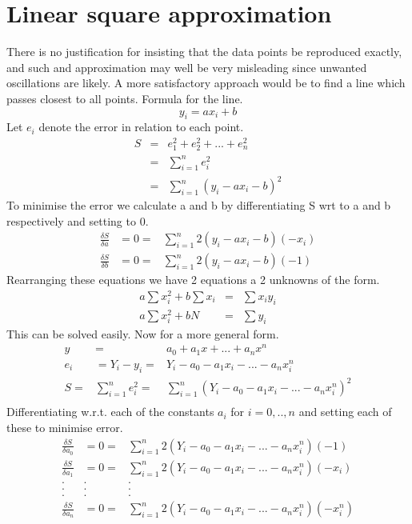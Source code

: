 \section{Linear square approximation}
There is no justification for insisting that the data points be reproduced exactly, and such and approximation may well be very misleading since unwanted oscillations are likely.  A more satisfactory approach would be to find a line which
passes closest to all points.
Formula for the line.
\[y_{i} = ax_i +b \]
Let $e_i$ denote the error in relation to each point.
\begin{eqnarray*}
 S &= &e_{1}^2 + e_{2}^2+ . . . + e_{n}^2 \\
& = & \sum_{i=1}^{n}e_i^2 \\
& = & \sum_{i=1}^{n}(y_i-ax_i-b)^2
\end{eqnarray*}
To minimise the error we calculate a and b by differentiating S wrt to a and b
respectively and setting to 0.
\begin{eqnarray*}
\frac{\delta S}{\delta a}& = 0 =& \sum_{i=1}^{n}2(y_i-ax_i-b)(-x_i)\\
\frac{\delta S}{\delta b}& = 0 =& \sum_{i=1}^{n}2(y_i-ax_i-b)(-1)
\end{eqnarray*}
Rearranging these equations we have 2 equations a 2 unknowns of the form.
\begin{eqnarray*}
a\sum x_{i}^2 + b \sum x_i &= & \sum x_i y_i \\
a\sum x_{i}^2 + b N &= & \sum  y_i 
\end{eqnarray*}
This can be solved easily.  Now for a more general form.
\begin{eqnarray*}
y & = & a_0 +a_1 x + ... + a_n x^n \\
e_i & = Y_i-y_i= & Y_i - a_0 -a_1 x_i - ... - a_n x_i^n \\
S = & \sum_{i=1}^n e_i^2 = &\sum_{i=1}^n (Y_i - a_0 -a_1 x_i - ... - a_n x_i^n)^2 \\
\end{eqnarray*}
Differentiating w.r.t. each of the constants $a_i$ for $i=0,..,n$ and setting each of these to minimise error.
\begin{eqnarray*}
\frac{\delta S}{\delta a_0}&= 0 =& \sum_{i=1}^{n}2(Y_i - a_0 -a_1 x_i - ... - a_n x_i^n)(-1) \\
\frac{\delta S}{\delta a_1}&= 0 =& \sum_{i=1}^{n}2(Y_i - a_0 -a_1 x_i - ... - a_n x_i^n) (-x_i)\\
.&.&.\\
.&.&.\\
.&.&.\\
\frac{\delta S}{\delta a_n}&= 0 =& \sum_{i=1}^{n}2(Y_i - a_0 -a_1 x_i - ... - a_n x_i^n) (-x_i^n)
\end{eqnarray*}
